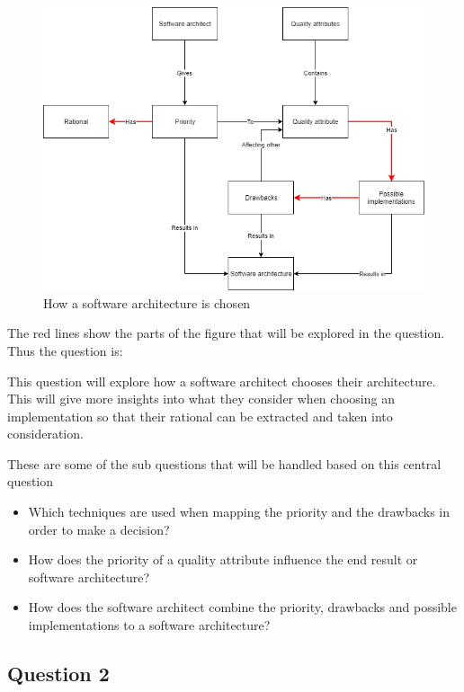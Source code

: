 \begin{figure}[H]
	\includegraphics[width=\linewidth]{creating_architecture.png}
	\caption{How a software architecture is chosen}
\end{figure}

The red lines show the parts of the figure that will be explored in the question. Thus the question is:


This question will explore how a software architect chooses their architecture. This will give more insights into what they consider when choosing an implementation so that their rational can be extracted and taken into consideration.

These are some of the sub questions that will be handled based on this central question
\begin{itemize}
	\item Which techniques are used when mapping the priority and the drawbacks in order to make a decision?
	\item How does the priority of a quality attribute influence the end result or software architecture?
	\item How does the software architect combine the priority, drawbacks and possible implementations to a software architecture?
\end{itemize}

\subsection{Question 2}
\label{sec:Question2}

